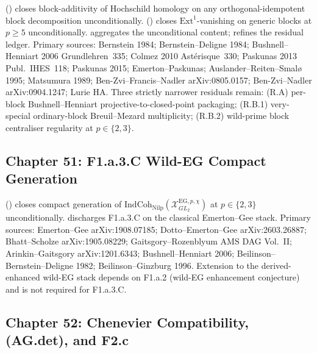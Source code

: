  (\ClaimStatusProvedHere)
closes block-additivity of Hochschild homology on any
orthogonal-idempotent block decomposition unconditionally.
 (\ClaimStatusProvedHere)
closes \(\mathrm{Ext}^{1}\)-vanishing on generic blocks at \(p\geq 5\)
unconditionally.
 aggregates the
unconditional content;
 refines the
residual ledger.
Primary sources: Bernstein 1984; Bernstein--Deligne 1984;
Bushnell--Henniart 2006 Grundlehren~335; Colmez 2010
Ast\'erisque~330; Paskunas 2013 Publ.~IHES~118; Paskunas 2015;
Emerton--Paskunas; Auslander--Reiten--Smal\o{} 1995; Matsumura 1989;
Ben-Zvi--Francis--Nadler arXiv:0805.0157; Ben-Zvi--Nadler
arXiv:0904.1247; Lurie HA.
Three strictly narrower residuals remain: (R.A) per-block
Bushnell--Henniart projective-to-closed-point packaging; (R.B.1)
very-special ordinary-block Breuil--Mezard multiplicity; (R.B.2)
wild-prime block centraliser regularity at \(p\in\{2,3\}\).

\subsection{Chapter 51: F1.a.3.C Wild-EG Compact Generation}
\label{v4-arith:w5-synth:ch51}

 (\ClaimStatusProvedHere)
closes compact generation of
\(\mathrm{IndCoh}_{\mathrm{Nilp}}(\mathcal{X}^{\mathrm{EG},p,\chi}_{GL_{2}})\)
at \(p\in\{2,3\}\) unconditionally.
 discharges F1.a.3.C
on the classical Emerton--Gee stack.
Primary sources: Emerton--Gee arXiv:1908.07185;
Dotto--Emerton--Gee arXiv:2603.26887; Bhatt--Scholze arXiv:1905.08229;
Gaitsgory--Rozenblyum AMS DAG Vol.~II; Arinkin--Gaitsgory
arXiv:1201.6343; Bushnell--Henniart 2006; Beilinson--Bernstein--Deligne
1982; Beilinson--Ginzburg 1996.
Extension to the derived-enhanced wild-EG stack depends on F1.a.2
(wild-EG enhancement conjecture) and is not required for F1.a.3.C.

\subsection{Chapter 52: Chenevier Compatibility, (AG.det), and F2.c}
\label{v4-arith:w5-synth:ch52}

